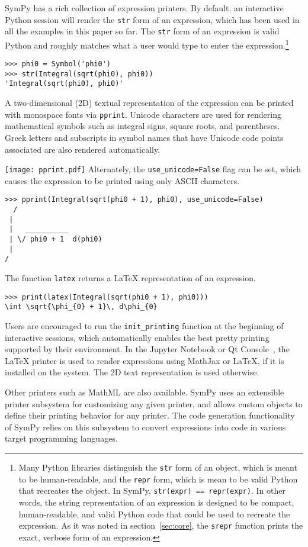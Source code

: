 SymPy has a rich collection of expression printers. By default, an interactive
Python session will render the \verb|str| form of an expression, which has
been used in all the examples in this paper so far. The \verb|str| form of an
expression is valid Python and roughly matches what a user would type to enter
the expression.\footnote{\label{note:repr}Many Python libraries distinguish the \texttt{str}
  form of an object, which is meant to be human-readable, and the
  \texttt{repr} form, which is mean to be valid Python that recreates the
  object. In SymPy, \texttt{str(expr) == repr(expr)}. In other words, the
  string representation of an expression is designed to be compact,
  human-readable, and valid Python code that could be used to recreate the
  expression. As it was noted in section~\ref{sec:core}, the \texttt{srepr}
  function prints the exact, verbose form of an expression.}

\begin{verbatim}
>>> phi0 = Symbol('phi0')
>>> str(Integral(sqrt(phi0), phi0))
'Integral(sqrt(phi0), phi0)'
\end{verbatim}

A two-dimensional (2D) textual representation of the expression can
be printed with monospace fonts via \verb|pprint|.
Unicode characters are used for rendering mathematical symbols such as integral signs,
square roots, and parentheses. Greek letters and subscripts in symbol names
that have Unicode code points associated
are also rendered automatically.

\noindent
\texttt{[image: pprint.pdf]}
Alternately, the \verb|use_unicode=False| flag can be set, which causes the
expression to be printed using only ASCII characters.

\begin{verbatim}
>>> pprint(Integral(sqrt(phi0 + 1), phi0), use_unicode=False)
  /
 |
 |   __________
 | \/ phi0 + 1  d(phi0)
 |
/
\end{verbatim}

The function \verb|latex| returns a \LaTeX{} representation of an expression.

\begin{verbatim}
>>> print(latex(Integral(sqrt(phi0 + 1), phi0)))
\int \sqrt{\phi_{0} + 1}\, d\phi_{0}
\end{verbatim}

Users are encouraged to run the \verb|init_printing| function at the beginning
of interactive sessions, which automatically enables the best pretty printing
supported by their environment. In the Jupyter Notebook or Qt
Console~\cite{perez2007ipython}, the \LaTeX{} printer is used to render
expressions using MathJax or \LaTeX{}, if it is installed on the system. The
2D text representation is used otherwise.

Other printers such as MathML are also available. SymPy uses an extensible
printer subsystem for customizing any given
printer, and allows custom objects to define their printing behavior for any
printer. The code generation functionality of SymPy
relies on this subsystem to convert expressions into code in various target
programming languages.
